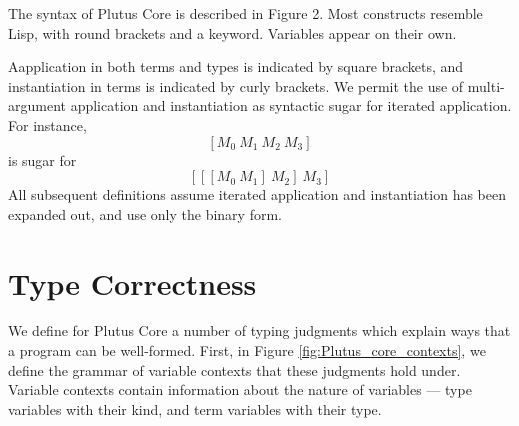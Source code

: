 \documentclass[conference]{IEEEtran}
\newcommand{\inst}[2]{\texttt{\{}#1 ~ #2\texttt{\}}}
\newcommand{\app}[2]{\texttt{[} #1 ~ #2 \texttt{]}}
\newcommand{\appT}[2]{\texttt{[} #1 ~ #2 \texttt{]}}
\begin{document}
The syntax of Plutus Core is described in Figure 2. Most constructs
resemble Lisp, with round brackets and a keyword. Variables appear on
their own.

Aapplication in both terms and types is indicated by square
brackets, and instantiation in terms is indicated by curly brackets. We
permit the use of multi-argument application and instantiation as
syntactic sugar for iterated application.
For instance,
\[
  [M_0 ~ M_1 ~ M_2 ~ M_3]
\] 
is sugar for
\[
  [[[M_0 ~ M_1] ~ M_2] ~ M_3]
\]
All subsequent definitions assume iterated application and instantiation
has been expanded out, and use only the binary form.
















%








\section{Type Correctness}

We define for Plutus Core a number of typing judgments which explain ways that a program can be well-formed. First, in Figure \ref{fig:Plutus_core_contexts}, we define the grammar of variable contexts that these judgments hold under. Variable contexts contain information about the nature of variables --- type variables with their kind, and term variables with their type.
\end{document}
